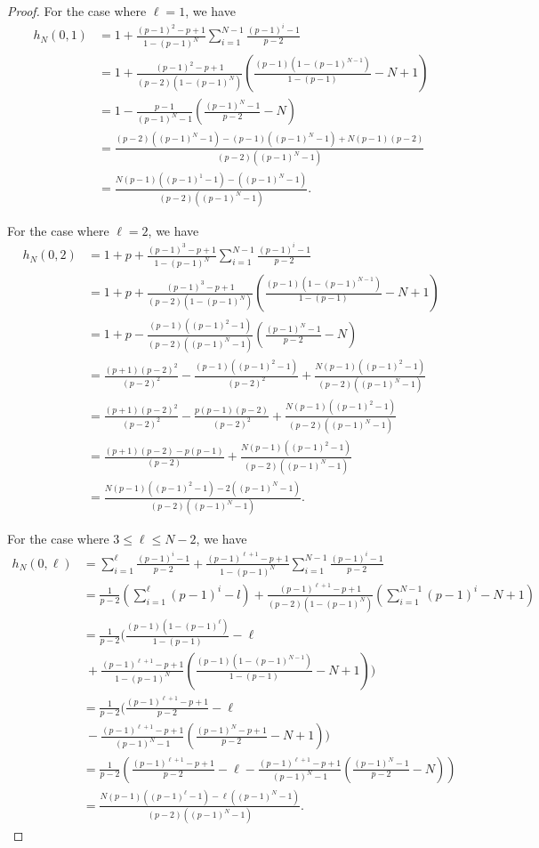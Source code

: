 \documentclass[12pt, leqno]{amsart}
\numberwithin{equation}{section}
\theoremstyle{plain}
\theoremstyle{definition}
\newcommand{\0}{\mathbf{0}}
\begin{document}
\begin{proof}
For the case where $\ell=1$, we have
\begin{align*}
h_N(0,1)&=1+\frac{(p-1)^2-p+1}{1-(p-1)^N}\sum_{i=1}^{N-1}\frac{(p-1)^i-1}{p-2}\\
&=1+\frac{(p-1)^2-p+1}{(p-2)(1-(p-1)^N)}(\frac{(p-1)(1-(p-1)^{N-1})}{1-(p-1)}-N+1)\\
&=1-\frac{p-1}{(p-1)^N-1}(\frac{(p-1)^N-1}{p-2}-N)\\
&=\frac{(p-2)((p-1)^N-1)-(p-1)((p-1)^N-1)+N(p-1)(p-2)}{(p-2)((p-1)^N-1)}\\
&=\frac{N(p-1)((p-1)^1-1)-((p-1)^N-1)}{(p-2)((p-1)^N-1)}.
\end{align*}

For the case where $\ell=2$, we have
\begin{align*}
h_N(0,2)&=1+p+\frac{(p-1)^3-p+1}{1-(p-1)^N}\sum_{i=1}^{N-1}\frac{(p-1)^i-1}{p-2}\\
&=1+p+\frac{(p-1)^3-p+1}{(p-2)(1-(p-1)^N)}(\frac{(p-1)(1-(p-1)^{N-1})}{1-(p-1)}-N+1)\\
&=1+p-\frac{(p-1)((p-1)^2-1)}{(p-2)((p-1)^N-1)}(\frac{(p-1)^N-1}{p-2}-N)\\
&=\frac{(p+1)(p-2)^2}{(p-2)^2}-\frac{(p-1)((p-1)^2-1)}{(p-2)^2}+\frac{N(p-1)((p-1)^2-1)}{(p-2)((p-1)^N-1)}\\
&=\frac{(p+1)(p-2)^2}{(p-2)^2}-\frac{p(p-1)(p-2)}{(p-2)^2}+\frac{N(p-1)((p-1)^2-1)}{(p-2)((p-1)^N-1)}\\
&=\frac{(p+1)(p-2)-p(p-1)}{(p-2)}+\frac{N(p-1)((p-1)^2-1)}{(p-2)((p-1)^N-1)}\\
&=\frac{N(p-1)((p-1)^2-1)-2((p-1)^N-1)}{(p-2)((p-1)^N-1)}.
\end{align*}

For the case where $3\leq \ell\leq N-2$, we have
\begin{align*}
h_N(0,\ell)&=\sum_{i=1}^\ell\frac{(p-1)^i-1}{p-2}+\frac{(p-1)^{\ell+1}-p+1}{1-(p-1)^N}\sum_{i=1}^{N-1}\frac{(p-1)^i-1}{p-2}\\
&=\frac{1}{p-2}(\sum_{i=1}^\ell(p-1)^i-l)+\frac{(p-1)^{\ell+1}-p+1}{(p-2)(1-(p-1)^N)}(\sum_{i=1}^{N-1}(p-1)^i-N+1)\\
&=\frac{1}{p-2}(\frac{(p-1)(1-(p-1)^\ell)}{1-(p-1)}-\ell\\
&~+\frac{(p-1)^{\ell+1}-p+1}{1-(p-1)^N}(\frac{(p-1)(1-(p-1)^{N-1})}{1-(p-1)}-N+1))\\
&=\frac{1}{p-2}(\frac{(p-1)^{\ell+1}-p+1}{p-2}-\ell\\
&~-\frac{(p-1)^{\ell+1}-p+1}{(p-1)^N-1}(\frac{(p-1)^N-p+1}{p-2}-N+1))\\
&=\frac{1}{p-2}(\frac{(p-1)^{\ell+1}-p+1}{p-2}-\ell-\frac{(p-1)^{\ell+1}-p+1}{(p-1)^N-1}(\frac{(p-1)^N-1}{p-2}-N))\\
&=\frac{N(p-1)((p-1)^\ell-1)-\ell((p-1)^N-1)}{(p-2)((p-1)^N-1)}.
\end{align*}


\end{proof}
\end{document}
